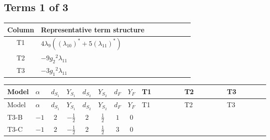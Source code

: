 \documentclass[8pt]{article}
\begin{document}
\begin{landscape}
\subsection*{Terms 1 of 3}
\begin{center}
\begin{tabular}{@{}c >{\raggedright\arraybackslash}p{0.82\linewidth}@{}}
\toprule
Column & Representative term structure \\
\midrule
T1 & \(\displaystyle 4 {\lambda_9} (\left({\lambda_{10}}\right)^{*}+5 \left({\lambda_{11}}\right)^{*})\) \\
\midrule
T2 & \(\displaystyle -9 {g_2}^2 {\lambda_{11}}\) \\
\midrule
T3 & \(\displaystyle -3 {g_1}^2 {\lambda_{11}}\) \\
\midrule
\bottomrule
\end{tabular}
\end{center}
\smallskip
\tiny
\begin{longtable}{@{}llcccccc >{\raggedright\arraybackslash}p{0.21\linewidth} >{\raggedright\arraybackslash}p{0.21\linewidth} >{\raggedright\arraybackslash}p{0.21\linewidth}@{}}
\toprule
Model & $\alpha$ & $d_{S_1}$ & $Y_{S_1}$ & $d_{S_2}$ & $Y_{S_2}$ & $d_F$ & $Y_F$ & T1 & T2 & T3 \\
\midrule
\endfirsthead
\toprule
Model & $\alpha$ & $d_{S_1}$ & $Y_{S_1}$ & $d_{S_2}$ & $Y_{S_2}$ & $d_F$ & $Y_F$ & T1 & T2 & T3 \\
\midrule
\endhead
T3-B & $-1$ & $2$ & $-\frac{1}{2}$ & $2$ & $\frac{1}{2}$ & $1$ & $0$ & \scriptsize\adjustbox{max width=\linewidth}{$\begin{gathered} 4 {\lambda_9} (\left({\lambda_{10}}\right)^{*}+5 \left({\lambda_{11}}\right)^{*})\end{gathered}$} & \scriptsize\adjustbox{max width=\linewidth}{$\begin{gathered} -9 {g_2}^2 {\lambda_{11}}\end{gathered}$} & \scriptsize\adjustbox{max width=\linewidth}{$\begin{gathered} -3 {g_1}^2 {\lambda_{11}}\end{gathered}$} \\
\midrule
T3-C & $-1$ & $2$ & $-\frac{1}{2}$ & $2$ & $\frac{1}{2}$ & $3$ & $0$ & \scriptsize\adjustbox{max width=\linewidth}{$\begin{gathered} 4 {\lambda_9} (\left({\lambda_{10}}\right)^{*}+5 \left({\lambda_{11}}\right)^{*})\end{gathered}$} & \scriptsize\adjustbox{max width=\linewidth}{$\begin{gathered} -9 {g_2}^2 {\lambda_{11}}\end{gathered}$} & \scriptsize\adjustbox{max width=\linewidth}{$\begin{gathered} -3 {g_1}^2 {\lambda_{11}}\end{gathered}$} \\

\end{longtable}
\end{landscape}
\end{document}
